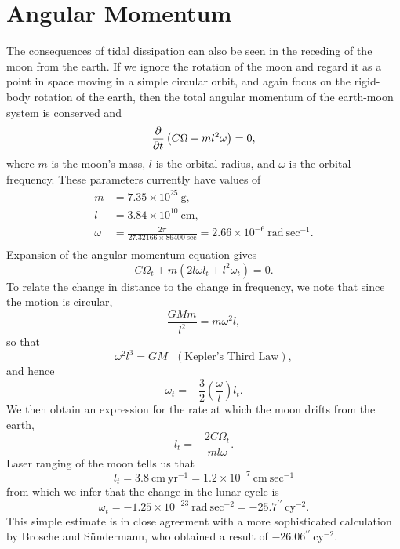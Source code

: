 \documentclass[11pt]{article}
\begin{document}
\section{Angular Momentum}
\label{AngMomentum}


The consequences of tidal dissipation can also be seen in the receding of the moon from the earth. If we ignore the rotation of the moon and regard it as a point in space moving in a simple circular orbit, and again focus on the rigid-body rotation of the earth, then the total angular momentum of the earth-moon system is conserved and
\begin{equation}
\frac{\partial }{\partial t} \left(C \Omega + m l^2 \omega \right) = 0,
\end{equation}
where $m$ is the moon's mass, $l$ is the orbital radius, and $\omega$ is the orbital frequency. These parameters currently have values of
\begin{align*}
m &= 7.35 \times 10^{25} \ \textrm{g}, \\
l &= 3.84 \times 10^{10} \ \textrm{cm}, \\
\omega &= \frac{2 \pi}{27.32166 \times 86400 \ \textrm{sec}} = 2.66 \times 10^{-6} \ \textrm{rad} \ \textrm{sec}^{-1}. \\
\end{align*}
Expansion of the angular momentum equation gives
\begin{equation*}
C \Omega_t + m \left(2 l \omega l_t + l^2 \omega_t \right) = 0.
\end{equation*}
To relate the change in distance to the change in frequency, we note that since the motion is circular,
\begin{equation*}
\frac{GMm}{l^2} = m \omega^2 l,
\end{equation*}
so that
\begin{equation*}
\omega^2 l^3 = GM \ \ \ (\textrm{Kepler's Third Law}), %
\end{equation*}
and hence
\begin{equation}
\label{MoonRotationRate}
\omega_t = -\frac{3}{2} \left(\frac{\omega}{l} \right) l_t.
\end{equation}
We then obtain an expression for the rate at which the moon drifts from the earth,
\begin{equation}
\label{OrbitalRadiusRate}
l_t = -\frac{2 C \Omega_t}{m l \omega}.
\end{equation}
Laser ranging of the moon tells us that
\begin{equation*}
l_t = 3.8 \ \textrm{cm} \ \textrm{yr}^{-1} = 1.2 \times 10^{-7} \ \textrm{cm} \ \textrm{sec}^{-1}
\end{equation*}
from which we infer that the change in the lunar cycle is
\begin{equation*}
\omega_t = -1.25 \times 10^{-23} \ \textrm{rad} \ \textrm{sec}^{-2} = -25.7^{\prime\prime} \ \textrm{cy}^{-2}.
\end{equation*}
This simple estimate is in close agreement with a more sophisticated calculation by Brosche and S\"undermann, who obtained a result of $-26.06^{\prime\prime} \ \textrm{cy}^{-2}$.\cite{Brosche1977}
\end{document}
